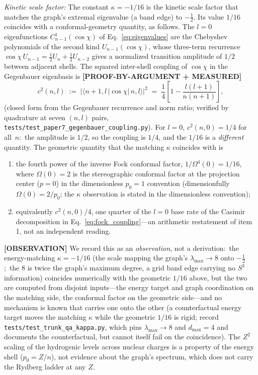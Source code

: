\documentclass[aps,pra,twocolumn,superscriptaddress,longbibliography]{revtex4-2}
\begin{document}
\textit{Kinetic scale factor:} The constant $\kappa = -1/16$ is the
kinetic scale factor that matches the graph's extremal eigenvalue (a
band edge) to $-\tfrac12$.  Its value $1/16$ coincides with a
conformal-geometry quantity, as follows.  The $l = 0$ eigenfunctions $C^1_{n-1}(\cos\chi)$ of
Eq.~\eqref{eq:eigenvalues} are the Chebyshev polynomials of the second
kind $U_{n-1}(\cos\chi)$, whose three-term recurrence $\cos\chi\,U_{n-1}
= \tfrac12 U_n + \tfrac12 U_{n-2}$ gives a normalized transition
amplitude of $1/2$ between adjacent shells.  The squared inter-shell
coupling of $\cos\chi$ in the Gegenbauer eigenbasis is
\textbf{[PROOF-BY-ARGUMENT + MEASURED]}
\begin{equation}
  c^2(n,l) \;:=\; \bigl|\langle n{+}1, l\,|\cos\chi|\,n, l\rangle\bigr|^2
  \;=\; \frac{1}{4}\!\left[ 1 - \frac{l(l+1)}{n(n+1)} \right],
  \label{eq:fock_coupling}
\end{equation}
(closed form from the Gegenbauer recurrence and norm ratio; verified by
quadrature at seven $(n,l)$ pairs,
\texttt{tests/test\_paper7\_gegenbauer\_coupling.py}).  For $l = 0$,
$c^2(n,0) = 1/4$ for all~$n$:\ the amplitude is $1/2$, so the coupling
is $1/4$, and the $1/16$ is a \emph{different} quantity.  The geometric quantity that
the matching $\kappa$ coincides with is
\begin{enumerate}
  \item the fourth power of the inverse Fock conformal factor, $1/\Omega^4(0) = 1/16$, where $\Omega(0) = 2$
        is the stereographic conformal factor at the projection center
        ($p = 0$) in the dimensionless $p_0 = 1$ convention
        (dimensionfully $\Omega(0) = 2/p_0$; the $\kappa$
        observation is stated in the dimensionless convention);
  \item equivalently $c^2(n,0)/4$, one quarter of the $l = 0$ base rate of
        the Casimir decomposition in Eq.~\eqref{eq:fock_coupling}---an
        arithmetic restatement of item 1, not an independent reading.
\end{enumerate}
\textbf{[OBSERVATION]} We record this as an \emph{observation}, not a derivation:\ the
energy-matching $\kappa = -1/16$ (the scale mapping the graph's
$\lambda_{\max} \to 8$ onto $-\tfrac12$;\ the $8$ is twice the graph's
maximum degree, a grid band edge carrying no $S^3$ information) coincides numerically with the
geometric $1/16$ above, but the two are computed from disjoint
inputs---the energy target and graph coordination on the matching
side, the conformal factor on the geometric side---and no mechanism is
known that carries one onto the other (a counterfactual energy target
moves the matching $\kappa$ while the geometric $1/16$ is rigid;
record \texttt{tests/test\_trunk\_qa\_kappa.py}, which pins
$\lambda_{\max} \to 8$ and $d_{\max} = 4$ and documents the
counterfactual, but cannot itself fail on the coincidence).  The $Z^2$ scaling
of the hydrogenic levels across nuclear charges is a property of the
energy shell ($p_0 = Z/n$), not evidence about the graph's spectrum,
which does not carry the Rydberg ladder at any $Z$.
\end{document}
